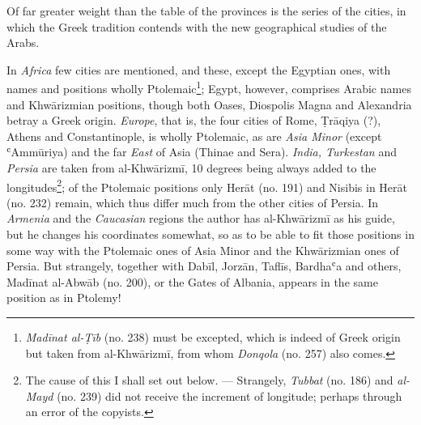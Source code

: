 \documentclass[11pt]{article}
\begin{document}
\par Of far greater weight than the table of the provinces is the series of the cities, in which the Greek tradition contends with the new geographical studies of the Arabs.\par
\par In \emph{Africa} few cities are mentioned, and these, except the Egyptian ones, with names and positions wholly Ptolemaic\footnote{\emph{Madīnat al-Ṭīb} (no. 238) must be excepted, which is indeed of Greek origin but taken from al-Khwārizmī, from whom \emph{Donqola} (no. 257) also comes.}; Egypt, however, comprises Arabic names and Khwārizmian positions, though both Oases, Diospolis Magna and Alexandria betray a Greek origin. \emph{Europe}, that is, the four cities of Rome, Ṭrāqiya (?), Athens and Constantinople, is wholly Ptolemaic, as are \emph{Asia Minor} (except ʿAmmūriya) and the far \emph{East} of Asia (Thinae and Sera). \emph{India, Turkestan} and \emph{Persia} are taken from al-Khwārizmī, 10 degrees being always added to the longitudes\footnote{The cause of this I shall set out below. — Strangely, \emph{Tubbat} (no. 186) and \emph{al-Mayd} (no. 239) did not receive the increment of longitude; perhaps through an error of the copyists.}; of the Ptolemaic positions only Herāt (no. 191) and Nisibis in Herāt (no. 232) remain, which thus differ much from the other cities of Persia. In \emph{Armenia} and the \emph{Caucasian} regions the author has al-Khwārizmī as his guide, but he changes his coordinates somewhat, so as to be able to fit those positions in some way with the Ptolemaic ones of Asia Minor and the Khwārizmian ones of Persia. But strangely, together with Dabīl, Jorzān, Taflīs, Bardhaʿa and others, Madīnat al-Abwāb (no. 200), or the Gates of Albania, appears in the same position as in Ptolemy!\par
\end{document}
